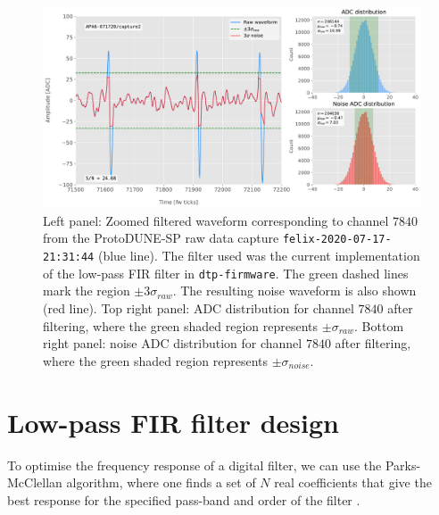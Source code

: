 \begin{figure}[t]
	\centering
	\includegraphics[width=1\linewidth]{Images/Matched_Filter/waveform_example_fir}
	\caption[Example filtered waveform from a ProtoDUNE-SP raw data capture.]{Left panel: Zoomed filtered waveform corresponding to channel $7840$ from the ProtoDUNE-SP raw data capture \texttt{felix-2020-07-17-21:31:44} (blue line). The filter used was the current implementation of the low-pass FIR filter in \texttt{dtp-firmware}. The green dashed lines mark the region $\pm3\sigma_{raw}$. The resulting noise waveform is also shown (red line). Top right panel: ADC distribution for channel $7840$ after filtering, where the green shaded region represents $\pm \sigma_{raw}$. Bottom right panel: noise ADC distribution for channel $7840$ after filtering, where the green shaded region represents $\pm \sigma_{noise}$.}
	\label{fig:adcs_fir}
\end{figure}

\section{Low-pass FIR filter design}
\label{sec:matched_filter_fir}

To optimise the frequency response of a digital filter, we can use the Parks-McClellan algorithm, where one finds a set of $N$ real coefficients that give the best response for the specified pass-band and order of the filter \cite{McClellan2005}.

